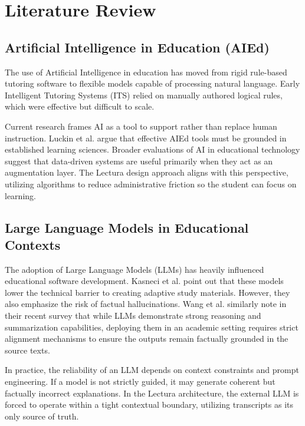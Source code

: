 \chapter{Literature Review}
\label{chap:lit_review}
\setlength{\parskip}{1em}

\section{Artificial Intelligence in Education (AIEd)}
The use of Artificial Intelligence in education has moved from rigid rule-based tutoring software to flexible models capable of processing natural language. Early Intelligent Tutoring Systems (ITS) relied on manually authored logical rules, which were effective but difficult to scale. 

Current research frames AI as a tool to support rather than replace human instruction. Luckin et al. \cite{luckin2016intelligence} argue that effective AIEd tools must be grounded in established learning sciences. Broader evaluations of AI in educational technology \cite{kazim2024ai} suggest that data-driven systems are useful primarily when they act as an augmentation layer. The Lectura design approach aligns with this perspective, utilizing algorithms to reduce administrative friction so the student can focus on learning.

\section{Large Language Models in Educational Contexts}
The adoption of Large Language Models (LLMs) has heavily influenced educational software development. Kasneci et al. \cite{kasneci2023chatgpt} point out that these models lower the technical barrier to creating adaptive study materials. However, they also emphasize the risk of factual hallucinations. Wang et al. \cite{wang2024large} similarly note in their recent survey that while LLMs demonstrate strong reasoning and summarization capabilities, deploying them in an academic setting requires strict alignment mechanisms to ensure the outputs remain factually grounded in the source texts.

In practice, the reliability of an LLM depends on context constraints and prompt engineering. If a model is not strictly guided, it may generate coherent but factually incorrect explanations. In the Lectura architecture, the external LLM is forced to operate within a tight contextual boundary, utilizing transcripts as its only source of truth.

